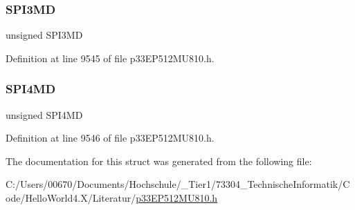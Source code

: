 \subsubsection{\texorpdfstring{S\+P\+I3\+MD}{SPI3MD}}
{\footnotesize\ttfamily unsigned S\+P\+I3\+MD}



Definition at line 9545 of file p33\+E\+P512\+M\+U810.\+h.

\mbox{\label{structtag_p_m_d6_b_i_t_s_aee9f827b4331dd5d16c15109d239db7d}} 
\subsubsection{\texorpdfstring{S\+P\+I4\+MD}{SPI4MD}}
{\footnotesize\ttfamily unsigned S\+P\+I4\+MD}



Definition at line 9546 of file p33\+E\+P512\+M\+U810.\+h.



The documentation for this struct was generated from the following file\+:\begin{DoxyCompactItemize}
\item 
C\+:/\+Users/00670/\+Documents/\+Hochschule/\+\_\+\+Tier1/73304\+\_\+\+Technische\+Informatik/\+Code/\+Hello\+World4.\+X/\+Literatur/\hyperlink{p33_e_p512_m_u810_8h}{p33\+E\+P512\+M\+U810.\+h}\end{DoxyCompactItemize}
